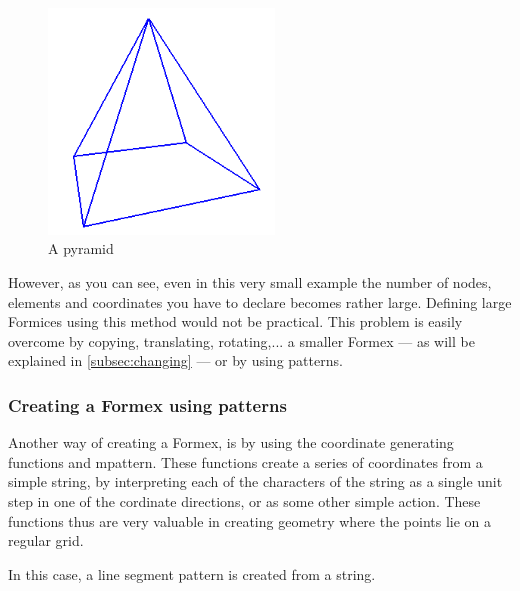 \begin{figure}[ht]
  \centering
  \begin{makeimage}
  \end{makeimage}
  \begin{latexonly}
    \includegraphics[width=6cm]{images/pyramide}
  \end{latexonly}
  \begin{htmlonly}
  \end{htmlonly}  
  \caption{A pyramid}
  \label{fig:pyramid}
\end{figure}

However, as you can see, even in this very small example the number of nodes, elements and coordinates you have to declare becomes rather large. Defining large Formices using this method would not be practical. This problem is easily overcome by copying, translating, rotating,... a smaller Formex --- as will be explained in \ref{subsec:changing} --- or by using patterns.
 
\subsubsection{Creating a Formex using patterns}

Another way of creating a Formex, is by using the coordinate generating functions  and {mpattern}. These functions create a series of coordinates from a simple string, by interpreting each of the characters of the string as a single unit step in one of the cordinate directions, or as some other simple action. These functions thus are very valuable in creating geometry where the points lie on a regular grid.

 


In this case, a line segment pattern is created from a string.

